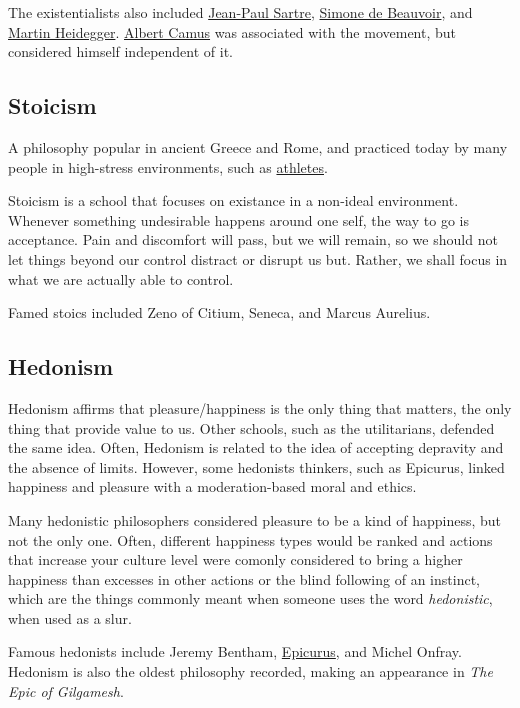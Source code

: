 \documentclass[../my_knowledge.tex]{subfiles}
\begin{document}
The existentialists also included \href{https://www.youtube.com/watch?v=3bQsZxDQgzU}{Jean-Paul Sartre}, \href{https://bigthink.com/the-present/ten-women-of-philosophy-and-why-you-should-know-them/}{Simone de Beauvoir}, and \href{https://www.youtube.com/watch?v=Br1sGrA7XTU&t=2s}{Martin Heidegger}. \href{https://www.youtube.com/watch?v=jQOfbObFOCw}{Albert Camus} was associated with the movement, but considered himself independent of it.

\subsection{Stoicism}
A philosophy popular in ancient Greece and Rome, and practiced today by many people in high-stress environments, such as \href{https://www.si.com/nfl/2015/12/08/ryan-holiday-nfl-stoicism-book-pete-carroll-bill-belichick}{athletes}.

Stoicism is a school that focuses on existance in a non-ideal environment. Whenever something undesirable happens around one self, the way to go is acceptance. Pain and discomfort will pass, but we will remain, so we should not let things beyond our control distract or disrupt us but. Rather, we shall focus in what we are actually able to control.

Famed stoics included Zeno of Citium, Seneca, and Marcus Aurelius.

\subsection{Hedonism}
Hedonism affirms that pleasure/happiness is the only thing that matters, the only thing that provide value to us. Other schools, such as the utilitarians, defended the same idea. Often, Hedonism is related to the idea of accepting depravity and the absence of limits. However, some hedonists thinkers, such as Epicurus, linked happiness and pleasure with a moderation-based moral and ethics.

Many hedonistic philosophers considered pleasure to be a kind of happiness, but not the only one. Often, different happiness types would be ranked and actions that increase your culture level were comonly considered to bring a higher happiness than excesses in other actions or the blind following of an instinct, which are the things commonly meant when someone uses the word \textit{hedonistic}, when used as a slur.

Famous hedonists include Jeremy Bentham, \href{https://www.youtube.com/watch?v=Kg_47J6sy3A}{Epicurus}, and Michel Onfray. Hedonism is also the oldest philosophy recorded, making an appearance in \textit{The Epic of Gilgamesh}.
\end{document}
